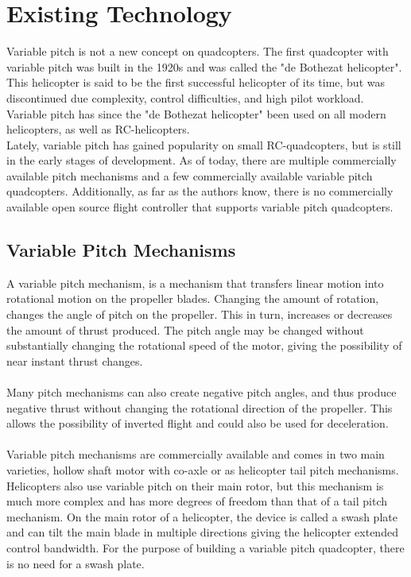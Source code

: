 \section{Existing Technology}

Variable pitch is not a new concept on quadcopters. The first quadcopter with variable pitch was built in the 1920s and was called the "de Bothezat helicopter". This helicopter is said to be the first successful helicopter of its time, but was discontinued due complexity, control difficulties, and high pilot workload. \cite{bothezat}
Variable pitch has since the "de Bothezat helicopter" been used on all modern helicopters, as well as RC-helicopters. \\

Lately, variable pitch has gained popularity on small RC-quadcopters, but is still in the early stages of development. As of today, there are multiple commercially available pitch mechanisms and a few commercially available variable pitch quadcopters. Additionally, as far as the authors know, there is no commercially available open source flight controller that supports variable pitch quadcopters.

\subsection{Variable Pitch Mechanisms}

A variable pitch mechanism, is a mechanism that transfers linear motion into rotational motion on the propeller blades. Changing the amount of rotation, changes the angle of pitch on the propeller. This in turn, increases or decreases the amount of thrust produced. The pitch angle may be changed without substantially changing the rotational speed of the motor, giving the possibility of near instant thrust changes. \\
\\
Many pitch mechanisms can also create negative pitch angles, and thus produce negative thrust without changing the rotational direction of the propeller. This allows the possibility of inverted flight and could also be used for deceleration.\\
\\
Variable pitch mechanisms are commercially available and comes in two main varieties, hollow shaft motor with co-axle or as helicopter tail pitch mechanisms. Helicopters also use variable pitch on their main rotor, but this mechanism is much more complex and has more degrees of freedom than that of a tail pitch mechanism. On the main rotor of a helicopter, the device is called a swash plate and can tilt the main blade in multiple directions giving the helicopter extended control bandwidth. For the purpose of building a variable pitch quadcopter, there is no need for a swash plate.

